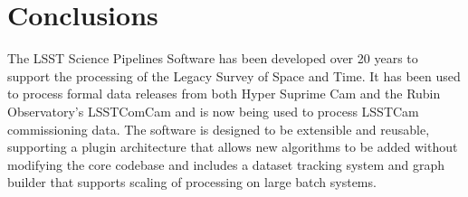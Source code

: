 \section{Conclusions}
\label{sec:conclusions}

The LSST Science Pipelines Software has been developed over 20 years to support the processing of the Legacy Survey of Space and Time.
It has been used to process formal data releases from both Hyper Suprime Cam and the Rubin Observatory's LSSTComCam and is now being used to process LSSTCam commissioning data.
The software is designed to be extensible and reusable, supporting a plugin architecture that allows new algorithms to be added without modifying the core codebase and includes a dataset tracking system and graph builder that supports scaling of processing on large batch systems.
